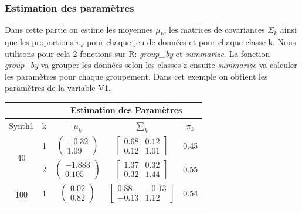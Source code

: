 \documentclass[10pt]{article}
\begin{document}
			\subsubsection{Estimation des paramètres}
			Dans cette partie on estime les moyennes $\mu_{k}$, les matrices de covariances $\Sigma_{k}$ ainsi que les proportions $\pi_{k}$ pour chaque jeu de données et pour chaque classe k. Nous utilisons pour cela 2 fonctions sur R: \textit{group\_by} et \textit{summarize}. La fonction \textit{group\_by} va grouper les données selon les classes z ensuite \textit{summarize} va calculer les paramètres pour chaque groupement. Dans cet exemple on obtient les paramètres de la variable V1.
			\begin{center}		
			\begin{tabular}{ | c | c | c | c | c |}
				\rowcolor{lightgray}
			& &  \multicolumn{3}{c|}{Estimation des Paramètres} \\
			\hline
			 Synth1 & k & $\mu_{k}$ & $\sum_{k}$ & $\pi_{k} $\\
			\hline
			\multirow{2}{*}{40}       &   1&     $\begin{pmatrix} -0.32\\1.09 \end{pmatrix}$                 &     $\begin{bmatrix} 0.68 & 0.12 \\ 0.12 & 1.01 \end{bmatrix}$      & 	0.45				\\\cline{2-5}
			
			      									        &   2&      $\begin{pmatrix} -1.883\\0.105 \end{pmatrix}$          &         $\begin{bmatrix} 1.37 & 0.32 \\ 0.32 &1.44 \end{bmatrix}$        & 			0.55  		\\  
			      									         
			\hline
			\hline
			\multirow{2}{*}{100}      &   1&    $\begin{pmatrix} 0.02\\0.82 \end{pmatrix}$              &           $\begin{bmatrix} 0.88 & -0.13 \\ -0.13 & 1.12 \end{bmatrix}$      & 		0.54	   \\\cline{2-5}
			      											

\end{tabular}
\end{center}
\end{document}
